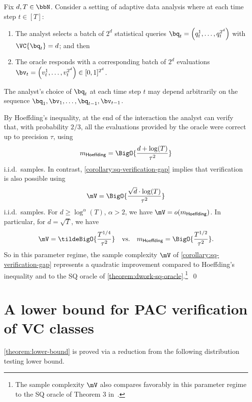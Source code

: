 \begin{example}
	Fix $d,T \in \bbN$. Consider a setting of adaptive data analysis where at each time step $t \in [T]$:
	\begin{enumerate}
		\item{
			The analyst selects a batch of $2^d$ statistical queries $\bq_t = \left(q_t^1,\dots,q_t^{2^d}\right)$ with $\VC{\bq_t} = d$; and then
		}
		\item{
			The oracle responds with a corresponding batch of $2^d$ evaluations $\bv_t = \left(v_t^1,\dots,v_t^{2^d}\right) \in [0,1]^{2^d}$.
		}
	\end{enumerate}
	The analyst's choice of $\bq_t$ at each time step $t$ may depend arbitrarily on the sequence $\bq_1,\bv_1,\dots,\allowbreak\bq_{t-1},\allowbreak\bv_{t-1}$.

	By Hoeffding's inequality, at the end of the interaction the analyst can verify that, with probability $2/3$, all the evaluations provided by the oracle were correct up to precision $\tau$, using 
	\[
		m_{\mathsf{Hoeffding}} = \BigO{\frac{d + \log(T)}{\tau^2}}
	\]
	i.i.d.\ samples. In contrast, \cref{corollary:sq-verification-gap} implies that verification is also possible using
	\[
		\mV = \BigO{
			\frac{
				\sqrt{d}\cdot \log(T)
			}{
				\tau^2
			}
		}
	\]
	i.i.d.\ samples. For $d \geq \log^\alpha(T)$, $\alpha > 2$, we have $\mV = o(m_{\mathsf{Hoeffding}})$. In particular, for $d = \sqrt{T}$, we have 
	\[
		\mV = \tildeBigO{\frac{T^{1/4}}{\tau^2}}
		 \quad \text{vs.} \quad
		m_{\mathsf{Hoeffding}} = \BigO{\frac{T^{1/2}}{\tau^2}}.
	\]
	So in this parameter regime, the sample complexity $\mV$ of \cref{corollary:sq-verification-gap} represents a quadratic improvement compared to Hoeffding's inequality and to the SQ oracle of \cref{theorem:dwork-sq-oracle}.\footnote{
		The sample complexity $\mV$ also compares favorably in this parameter regime to the SQ oracle of Theorem 3 in~\cite{DBLP:conf/stoc/DworkFHPRR15}. 
	}~\qed
\end{example}



\section{A lower bound for PAC verification of VC classes}
\label{section:lower-bound}

\cref{theorem:lower-bound} is proved via a reduction from the following distribution testing lower bound.

